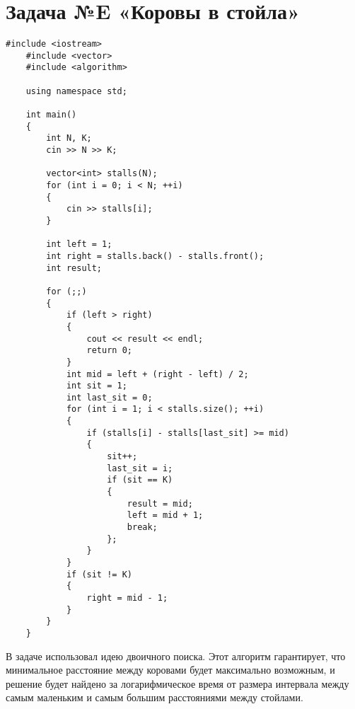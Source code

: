 \documentclass{article}
\begin{document}
\section{Задача №E «Коровы в стойла»}
\begin{lstlisting}[frame=single, basicstyle=\ttfamily, breaklines=true, breakatwhitespace=true, postbreak=\mbox{\textcolor{red}{$\hookrightarrow$}\space}]
    #include <iostream>
    #include <vector>
    #include <algorithm>
    
    using namespace std;
    
    int main()
    {
        int N, K;
        cin >> N >> K;
    
        vector<int> stalls(N);
        for (int i = 0; i < N; ++i)
        {
            cin >> stalls[i];
        }
    
        int left = 1;
        int right = stalls.back() - stalls.front();
        int result;
    
        for (;;)
        {
            if (left > right)
            {
                cout << result << endl;
                return 0;
            }
            int mid = left + (right - left) / 2;
            int sit = 1;
            int last_sit = 0;
            for (int i = 1; i < stalls.size(); ++i)
            {
                if (stalls[i] - stalls[last_sit] >= mid)
                {
                    sit++;
                    last_sit = i;
                    if (sit == K)
                    {
                        result = mid;
                        left = mid + 1;
                        break;
                    };
                }
            }
            if (sit != K)
            {
                right = mid - 1;
            }
        }
    }    
\end{lstlisting}
В задаче использовал идею двоичного поиска. 
Этот алгоритм гарантирует, что минимальное расстояние между коровами будет максимально возможным, и решение будет найдено за логарифмическое время от размера интервала между самым маленьким и самым большим расстояниями между стойлами.
\end{document}
